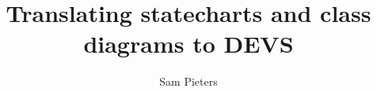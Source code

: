 \documentclass[a4paper,12pt]{report}
\title{Translating statecharts and class diagrams to DEVS}
\author{Sam Pieters}
\begin{document}
\frontpages



\mainbodypages






\backpages

\begin{appendices}

\end{appendices}

\end{document}
